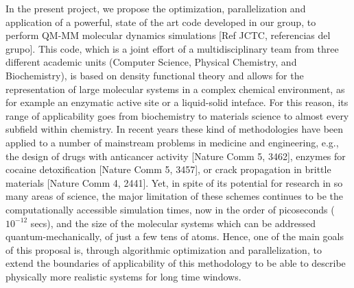 \documentclass[a4paper,10pt]{article}
\begin{document}
In the present project, we propose the optimization, parallelization and application of a powerful, state of the art code developed in our group, to perform QM-MM molecular
dynamics simulations [Ref JCTC, referencias del grupo]. 
This code, which is a joint effort of a multidisciplinary team from three different academic units (Computer Science, Physical Chemistry, and Biochemistry), is based on density functional theory and allows for the representation of large molecular systems in a complex chemical environment, as for example an enzymatic active site or a liquid-solid inteface. 
For this reason, its range of applicability goes from biochemistry to materials science to almost every subfield within chemistry. 
In recent years these kind of methodologies have been applied to a number of mainstream problems in medicine and engineering, e.g., the design of drugs with anticancer activity [Nature Comm 5, 3462], enzymes for cocaine detoxification [Nature Comm 5, 3457], or crack propagation in brittle materials [Nature Comm 4, 2441]. 
Yet, in spite of its potential for research in so many areas of science, the major limitation of these schemes continues to be the computationally accessible simulation times, now in the
order of picoseconds ($10^{-12}$ secs), and the size of the molecular systems which can be addressed quantum-mechanically, of just a few tens of atoms. 
Hence, one of the main goals of this proposal is, through algorithmic optimization and parallelization, to extend the boundaries of applicability of this methodology to be able to describe physically more realistic systems for long time windows.
\end{document}
